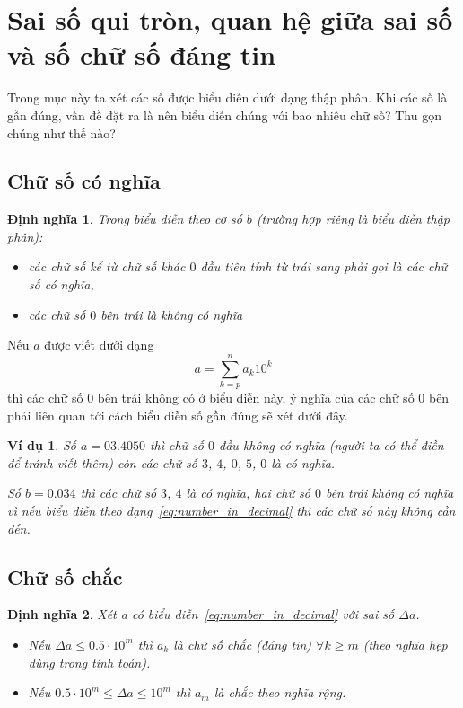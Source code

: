\documentclass{book}
\newtheorem{definition}{Định nghĩa}
\newtheorem{exmp}{Ví dụ}[chapter]
\begin{document}
\section[Sai số quy tròn, quan hệ sai số \& số chữ số chắc]{Sai số qui tròn, quan hệ giữa sai số và số chữ số đáng tin}

Trong mục này ta xét các số được biểu diễn dưới dạng thập phân. Khi các số là
gần đúng, vấn đề đặt ra là nên biểu diễn chúng với bao nhiêu chữ số? Thu gọn
chúng như thế nào?

\subsection{Chữ số có nghĩa}

\begin{definition}
    Trong biểu diễn theo cơ số \(b\) (trường hợp riêng là biểu diễn thập phân):
    \begin{itemize}
        \item các chữ số kể từ chữ số khác \(0\) đầu tiên tính từ trái sang phải
            gọi là \emph{các chữ số có nghĩa},
        \item các chữ số \(0\) bên trái là \emph{không có nghĩa}
    \end{itemize}
\end{definition}

Nếu \(a\) được viết dưới dạng
\begin{equation} \label{eq:number_in_decimal}
    a = \sum_{k=p}^{n} a_k10^k
\end{equation}
thì các chữ số \(0\) bên trái không có ở biểu diễn này, ý nghĩa của các chữ số
\(0\) bên phải liên quan tới cách biểu diễn số gần đúng sẽ xét dưới đây.

\begin{exmp}
    Số \(a = 03.4050\) thì chữ số \(0\) đầu không có nghĩa (người ta có thể điền
    để tránh viết thêm) còn các chữ số \(3\), \(4\), \(0\), \(5\), \(0\) là có
    nghĩa.

    Số \(b = 0.034\) thì các chữ số \(3\), \(4\) là có nghĩa, hai chữ số \(0\)
    bên trái không có nghĩa vì nếu biểu diễn theo dạng~\ref{eq:number_in_decimal}
    thì các chữ số này không cần đến.
\end{exmp}

\subsection{Chữ số chắc}

\begin{definition}
    Xét a có biểu diễn~\ref{eq:number_in_decimal} với sai số \(\Delta a\).
    \begin{itemize}
        \item Nếu \(\Delta a \leq \num{0.5} \cdot 10^m\) thì \(a_k\) là
            \emph{chữ số chắc (đáng tin)} \(\forall k \geq m\) (theo nghĩa hẹp
            dùng trong tính toán).
        \item Nếu \(\num{0.5} \cdot 10^m \leq \Delta a \leq 10^m\) thì \(a_m\)
            là \emph{chắc theo nghĩa rộng}.
    \end{itemize}
\end{definition}
\end{document}
